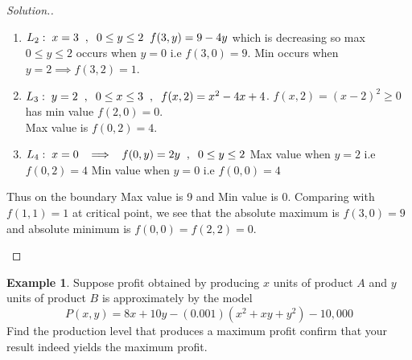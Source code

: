 \documentclass[11pt,a4paper]{article}
\theoremstyle{definition}
\newtheorem{exa}[thm]{Example}
\newenvironment{solution}
  {\renewcommand{\qedsymbol}{}\begin{proof}[\textit{Solution}.]}
  {\end{proof}}
\begin{document}
\begin{solution}
\begin{enumerate}
\begin{enumerate}
        \item[On] $L_2:\hspace{0.1cm} x = 3\hspace{0.2cm}  , \hspace{0.2cm} 0\leq y \leq 2\hspace{0.2cm} f(3,y) = 9 - 4y$ which is decreasing so max $0\leq y \leq 2 $ occurs when $y = 0$ i.e $f(3,0) = 9$. Min occurs when $y = 2 \implies f(3,2) = 1$.


\begin{figure}[H]
\centering
{}
\end{figure}

        \item[On] $L_3:\hspace{0.1cm} y = 2 \hspace{0.2cm}  , \hspace{0.2cm} 0\leq x \leq 3 \hspace{0.2cm}  , \hspace{0.2cm} f(x,2) = x^2 - 4x + 4$.
        $f(x,2) = (x-2)^2\geq 0$ has min value $f(2,0) = 0$.\\ Max value is $f(0,2) = 4$.

        \item[On] $L_4:\hspace{0.1cm} x = 0 \hspace{0.2cm} \implies  \hspace{0.2cm} f(0,y) = 2y \hspace{0.2cm}  , \hspace{0.2cm} 0\leq y \leq 2$
        Max value when $y = 2$ i.e $f(0,2) = 4$
        Min value when $y = 0$ i.e $f(0,0) = 4$
\end{enumerate}

Thus on the boundary Max value is 9 and Min value is 0. Comparing with $f(1,1)=1$ at critical point, we see that the absolute maximum is $f(3,0) = 9$ and absolute minimum is $f(0,0) = f(2,2) = 0$.
\end{enumerate}
\end{solution}

\begin{exa}


Suppose profit obtained by producing $x$ units of product $A$ and $y$ units of product $B$ is approximately by the model $$P(x,y) = 8x + 10y - (0.001)(x^2 + xy + y^2) - 10,000$$ Find the production level that produces a maximum profit confirm that your result indeed yields the maximum profit.
\end{exa}
\end{document}
